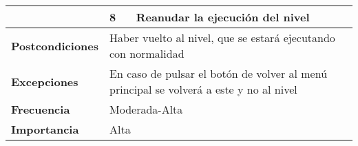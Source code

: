 \begin{longtable}{lll}
\multicolumn{1}{l|}{}                            & 8                         & Reanudar la ejecución del nivel                                                \\ \hline
\textbf{Postcondiciones}                         & \multicolumn{2}{l}{Haber vuelto al nivel, que se estará ejecutando con normalidad}                         \\ \hline
\textbf{Excepciones}                             & \multicolumn{2}{l}{En caso de pulsar el botón de volver al menú principal se volverá a este y no al nivel} \\ \hline
\textbf{Frecuencia}                              & \multicolumn{2}{l}{Moderada-Alta}                                                                          \\ \hline
\textbf{Importancia}                             & \multicolumn{2}{l}{Alta}                                                                                   \\ \hline
\end{longtable}


